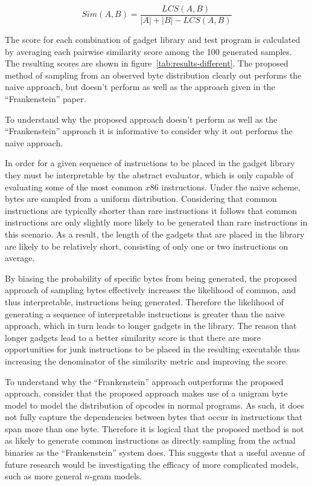     $$Sim(A,B) = \frac{LCS(A,B)}{|A| + |B| - LCS(A,B)}$$

    The score for each combination of gadget library and test program is
    calculated by averaging each pairwise similarity score among the 100
    generated samples. The resulting scores are shown in
    figure~\ref{tab:results-different}. The proposed method of sampling from an
    observed byte distribution clearly out performs the naive approach, but
    doesn't perform as well as the approach given in the ``Frankenstein''
    paper\cite{franken}.

    To understand why the proposed approach doesn't perform as well as the
    ``Frankenstein'' approach it is informative to consider why it out performs
    the naive approach.
    
    In order for a given sequence of instructions to be placed in the gadget
    library they must be interpretable by the abstract evaluator, which is only
    capable of evaluating some of the most common $x86$ instructions. Under the
    naive scheme, bytes are sampled from a uniform distribution. Considering
    that common instructions are typically shorter than rare instructions it
    follows that common instructions are only slightly more likely to be
    generated than rare instructions in this scenario. As a result, the length
    of the gadgets that are placed in the library are likely to be relatively
    short, consisting of only one or two instructions on average.

    By biasing the probability of specific bytes from being generated, the
    proposed approach of sampling bytes effectively increases the likelihood of
    common, and thus interpretable, instructions being generated. Therefore the
    likelihood of generating a sequence of interpretable instructions is greater
    than the naive approach, which in turn leads to longer gadgets in the
    library. The reason that longer gadgets lead to a better similarity score is
    that there are more opportunities for junk instructions to be placed in the
    resulting executable thus increasing the denominator of the similarity
    metric and improving the score.
    
    To understand why the ``Frankenstein'' approach outperforms the proposed
    approach, consider that the proposed approach makes use of a unigram byte
    model to model the distribution of opcodes in normal programs. As such, it
    does not fully capture the dependencies between bytes that occur in
    instructions that span more than one byte. Therefore it is logical that the
    proposed method is not as likely to generate common instructions as directly
    sampling from the actual binaries as the ``Frankenstein'' system does. This
    suggests that a useful avenue of future research would be investigating the
    efficacy of more complicated models, such as more general $n$-gram models.

